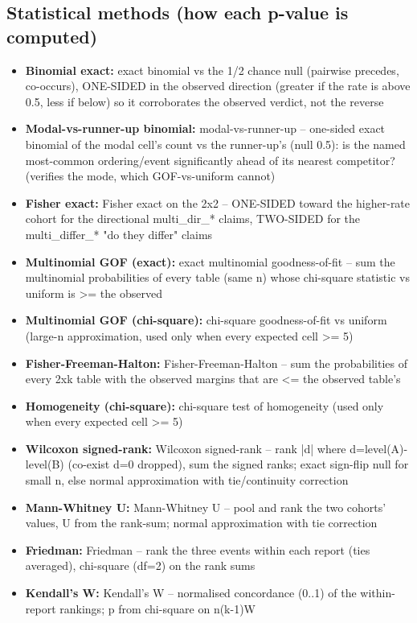 \documentclass[11pt]{article}
\begin{document}
\subsection*{Statistical methods (how each p-value is computed)}
\begin{itemize}
\item \textbf{Binomial exact:} exact binomial vs the 1/2 chance null (pairwise precedes, co-occurs), ONE-SIDED in the observed direction (greater if the rate is above 0.5, less if below) so it corroborates the observed verdict, not the reverse
\item \textbf{Modal-vs-runner-up binomial:} modal-vs-runner-up -- one-sided exact binomial of the modal cell's count vs the runner-up's (null 0.5): is the named most-common ordering/event significantly ahead of its nearest competitor? (verifies the mode, which GOF-vs-uniform cannot)
\item \textbf{Fisher exact:} Fisher exact on the 2x2 -- ONE-SIDED toward the higher-rate cohort for the directional multi\_dir\_* claims, TWO-SIDED for the multi\_differ\_* "do they differ" claims
\item \textbf{Multinomial GOF (exact):} exact multinomial goodness-of-fit -- sum the multinomial probabilities of every table (same n) whose chi-square statistic vs uniform is >= the observed
\item \textbf{Multinomial GOF (chi-square):} chi-square goodness-of-fit vs uniform (large-n approximation, used only when every expected cell >= 5)
\item \textbf{Fisher-Freeman-Halton:} Fisher-Freeman-Halton -- sum the probabilities of every 2xk table with the observed margins that are <= the observed table's
\item \textbf{Homogeneity (chi-square):} chi-square test of homogeneity (used only when every expected cell >= 5)
\item \textbf{Wilcoxon signed-rank:} Wilcoxon signed-rank -- rank |d| where d=level(A)-level(B) (co-exist d=0 dropped), sum the signed ranks; exact sign-flip null for small n, else normal approximation with tie/continuity correction
\item \textbf{Mann-Whitney U:} Mann-Whitney U -- pool and rank the two cohorts' values, U from the rank-sum; normal approximation with tie correction
\item \textbf{Friedman:} Friedman -- rank the three events within each report (ties averaged), chi-square (df=2) on the rank sums
\item \textbf{Kendall's W:} Kendall's W -- normalised concordance (0..1) of the within-report rankings; p from chi-square on n(k-1)W
\end{itemize}
\end{document}
